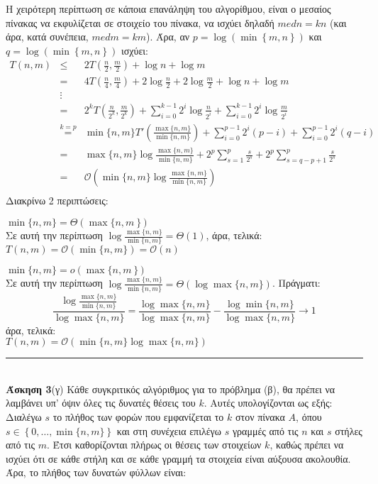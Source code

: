\documentclass[12pt]{article}
\newcommand\bigOh{\mathcal{O}}
\newenvironment{b_item}{
\begin{itemize}
  \setlength{\itemsep}{0pt}
  \setlength{\parskip}{0pt}
  \setlength{\parsep}{0pt}
}{\end{itemize}}
\newcommand{\HRule}{\rule{\linewidth}{0.1mm}}
\begin{document}
\greektext
Η χειρότερη περίπτωση σε κάποια επανάληψη του αλγορίθμου, είναι ο μεσαίος πίνακας να εκφυλίζεται σε στοιχείο του πίνακα, να ισχύει δηλαδή $medn=kn$ (και άρα, κατά συνέπεια, $medm=km$). Άρα, αν $p=\log\left(\min\left\{m,n\right\}\right)$ και $q=\log\left(\min\left\{m,n\right\}\right)$ ισχύει:\\
$\begin{array}{rcl}T\left(n,m\right)
&\leq&2T\left(\frac{n}{2},\frac{m}{2}\right)+\log n+\log m\\
&=&4T\left(\frac{n}{4},\frac{m}{4}\right)+2\log\frac{n}{2}+2\log\frac{m}{2}+\log n+\log m\\
&\vdots&\\
&=&2^kT\left(\frac{n}{2^k},\frac{m}{2^k}\right)+\sum_{i=0}^{k-1}2^i\log\frac{n}{2^i}+\sum_{i=0}^{k-1}2^i\log\frac{m}{2^i}\\
&\overset{k=p}{=}&\min\{n,m\}T'\left(\frac{\max\{n,m\}}{\min\{n,m\}}\right)+\sum_{i=0}^{p-1}2^i\left(p-i\right)+\sum_{i=0}^{p-1}2^i\left(q-i\right)\\
&=&\max\{n,m\}\log\frac{\max\{n,m\}}{\min\{n,m\}}+2^p\sum_{s=1}^p\frac{s}{2^s}+2^p\sum_{s=q-p+1}^p\frac{s}{2^s}\\
&=&\bigOh\left(\min\{n,m\}\log\frac{\max\{n,m\}}{\min\{n,m\}}\right)\\
\end{array}$\\
Διακρίνω 2 περιπτώσεις:
\begin{b_item}
\item $\min\{n,m\}=\Theta\left(\max\{n,m\right\})$\\
Σε αυτή την περίπτωση $\log\frac{\max\{n,m\}}{\min\{n,m\}}=\Theta\left(1\right)$, άρα, τελικά:\\
$T\left(n,m\right)=\bigOh\left(\min\{n,m\}\right)=\bigOh\left(n\right)$
\item $\min\{n,m\}=o\left(\max\{n,m\right\})$\\
Σε αυτή την περίπτωση $\log\frac{\max\{n,m\}}{\min\{n,m\}}=\Theta\left(\log\max\{n,m\}\right)$. Πράγματι:
$$\frac{\log\frac{\max\{n,m\}}{\min\{n,m\}}}{\log\max\{n,m\}}=\frac{\log\max\{n,m\}}{\log\max\{n,m\}}-\frac{\log\min\{n,m\}}{\log\max\{n,m\}}\to1$$
άρα, τελικά:\\
$T\left(n,m\right)=\bigOh\left(\min\{n,m\}\log\max\{n,m\}\right)$
\end{b_item}
\HRule\\
{\bf Άσκηση 3}(γ) Κάθε συγκριτικός αλγόριθμος για το πρόβλημα (β), θα πρέπει να λαμβάνει υπ' όψιν όλες τις δυνατές θέσεις του $k$. Αυτές υπολογίζονται ως εξής: Διαλέγω $s$ το πλήθος των φορών που εμφανίζεται το $k$ στον πίνακα $A$, όπου $s\in\left\{0,\ldots,\min\{n,m\}\right\}$ και στη συνέχεια επιλέγω $s$ γραμμές από τις $n$ και $s$ στήλες από τις $m$. Έτσι καθορίζονται πλήρως οι θέσεις των στοιχείων $k$, καθώς πρέπει να ισχύει ότι σε κάθε στήλη και σε κάθε γραμμή τα στοιχεία είναι αύξουσα ακολουθία. Άρα, το πλήθος των δυνατών φύλλων είναι:
\end{document}
